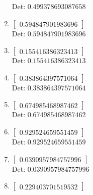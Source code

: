 \documentclass[12pt]{article}
\begin{document}
\begin{enumerate}
Det: $0.499378693087658$\\

\item $\displaystyle \left[\begin{matrix}0.594847901983696\end{matrix}\right]$\\

Det: $0.594847901983696$\\

\item $\displaystyle \left[\begin{matrix}0.155416386323413\end{matrix}\right]$\\

Det: $0.155416386323413$\\

\item $\displaystyle \left[\begin{matrix}0.383864397571064\end{matrix}\right]$\\

Det: $0.383864397571064$\\

\item $\displaystyle \left[\begin{matrix}0.674985468987462\end{matrix}\right]$\\

Det: $0.674985468987462$\\

\item $\displaystyle \left[\begin{matrix}0.929524659551459\end{matrix}\right]$\\

Det: $0.929524659551459$\\

\item $\displaystyle \left[\begin{matrix}0.0390957984757996\end{matrix}\right]$\\

Det: $0.0390957984757996$\\

\item $\displaystyle \left[\begin{matrix}0.229403701519532\end{matrix}\right]$\\


\end{enumerate}
\end{document}

